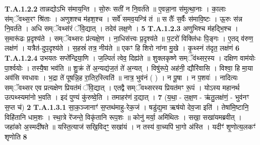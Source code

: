 \documentclass[17pt]{extarticle}
\begin{document}
                                                                  \textbf{ T.A.1.2.2} \newline
                  तान्नद्योऽभि स॑माय॒न्ति । सो॒रुः सती॑ न नि॒वर्त॑ते ॥  ए॒वन्ना॒ना स॑मुत्था॒नाः । का॒लाः स॑म्ॅवथ्स॒रꣳ श्रि॑ताः । अणुशश्च म॑हश॒श्च । सर्वे॑ समव॒यन्त्रि॑ तं ॥ स तैः᳚ स॒र्वैः स॑मावि॒ष्टः । ऊ॒रुः स॑न्न नि॒वर्त॑ते । अधि सम्ॅवथ्स॑रं ॅवि॒द्यात् ।  तदेव॑ लक्ष॒णे । \textbf{ 5} \newline
                  \newline
                                                                  \textbf{ T.A.1.2.3} \newline
                  अणुभिश्च म॑हद्भि॒श्च । स॒मारू॑ढः प्र॒दृश्य॑ते । सम्ॅवथ्सरः प्र॑त्यक्षे॒ण ।  ना॒धिस॑त्त्वः प्र॒दृश्य॑ते ॥ प॒टरो॑ विक्लि॑धः पि॒ङ्गः । ए॒तद् व॑रुण॒ लक्ष॑णं । यत्रैत॑-दुप॒दृश्य॑ते । स॒हस्रं॑ तत्र॒ नीय॑ते ॥  एकꣳ हि शिरो ना॑ना मु॒खे । कृ॒थ्स्नं त॑दृत॒ लक्ष॑णं \textbf{ 6} \newline
                  \newline
                                                                  \textbf{ T.A.1.2.4} \newline
                  उभयतः सप्ते᳚न्द्रिया॒णि । ज॒ल्पितं॑ त्वेव॒ दिह्य॑ते ॥  शुक्लकृष्णे सम्ॅव॑थ्सर॒स्य । दक्षिण वाम॑योः पा॒र्श्वयोः । तस्यै॒षा भव॑ति ॥ शु॒क्रं ते॑ अ॒न्यद्य॑ज॒तं ते॑ अ॒न्यत् ।  विषु॑रूपे॒ अह॑नी॒ द्यौरि॑वासि । विश्वा॒ हि मा॒या अव॑सि स्वधावः । भ॒द्रा ते॑ पूषन्नि॒ह रा॒तिर॒स्त्विति॑ ॥  नात्र॒ भुव॑नं ( ) । न पू॒षा । न प॒शवः॑ ।  नादित्यः सम्ॅवथ्सर एव प्रत्यक्षेण प्रियत॑मं ॅवि॒द्यात् । एतद्वै सम्ॅवथ्सरस्य प्रियत॑मꣳ रू॒पं । योऽस्य महानर्थ उत्पथ्स्यमा॑नो भ॒वति । इदं पुण्यं कु॑रुष्वे॒ति । तमाहर॑णं द॒द्यात् । \textbf{ 7} \newline
                  \newline
                                                        (य॒था॒ - ल॒क्ष॒ण - ऋ॑तु॒लक्ष॑णं॒ - भुव॑नꣳ स॒प्त च॑) \textbf{2} \newline \newline
                                \textbf{ T.A.1.3.1} \newline
                  सा॒क॒ञ्जानाꣳ॑ स॒प्तथ॑माहु-रेक॒जं । षडु॑द्य॒मा ऋष॑यो देव॒जा इति॑ । तेषा॑मि॒ष्टानि॒ विहि॑तानि धाम॒शः । स्था॒त्रे रे॑जन्ते॒ विकृ॑तानि रूप॒शः ॥ कोनु॑ मर्या॒ अमि॑थितः । सखा॒ सखा॑यमब्रवीत् । जहा॑को अ॒स्मदी॑षते ॥ यस्ति॒त्याज॑ सखि॒विदꣳ॒॒ सखा॑यं ।  न तस्य॑ वा॒च्यपि॑ भा॒गो अ॑स्ति ।  यदीꣳ॑ शृ॒णोत्य॒लकꣳ॑ शृणोति \textbf{ 8} \newline
                  \newline
\end{document}
